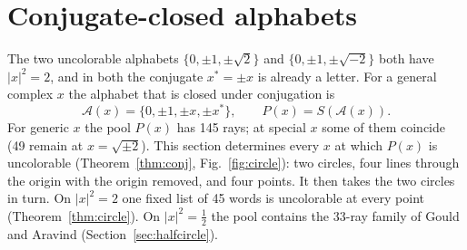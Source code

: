 \section{Conjugate-closed alphabets}\label{sec:conj}

The two uncolorable alphabets $\{0,\pm1,\pm\sqrt2\}$ and $\{0,\pm1,\pm\sqrt{-2}\}$ both have
$|x|^2=2$, and in both the conjugate $x^{*}=\pm x$ is already a letter.  For a general complex
$x$ the alphabet that is closed under conjugation is
\[
\mathcal A(x)=\{0,\pm1,\pm x,\pm x^{*}\},\qquad P(x)=S(\mathcal A(x)).
\]
For generic $x$ the pool $P(x)$ has 145 rays; at special $x$ some of them coincide (49 remain
at $x=\sqrt{\pm2}$).  This section determines every $x$ at which $P(x)$ is uncolorable
(Theorem~\ref{thm:conj}, Fig.~\ref{fig:circle}): two circles, four lines through the origin
with the origin removed, and four points.  It
then takes the two circles in turn.  On $|x|^2=2$ one fixed list of 45 words is uncolorable at
every point (Theorem~\ref{thm:circle}).  On $|x|^2=\tfrac12$ the pool contains the 33-ray family
of Gould and Aravind (Section~\ref{sec:halfcircle}).

